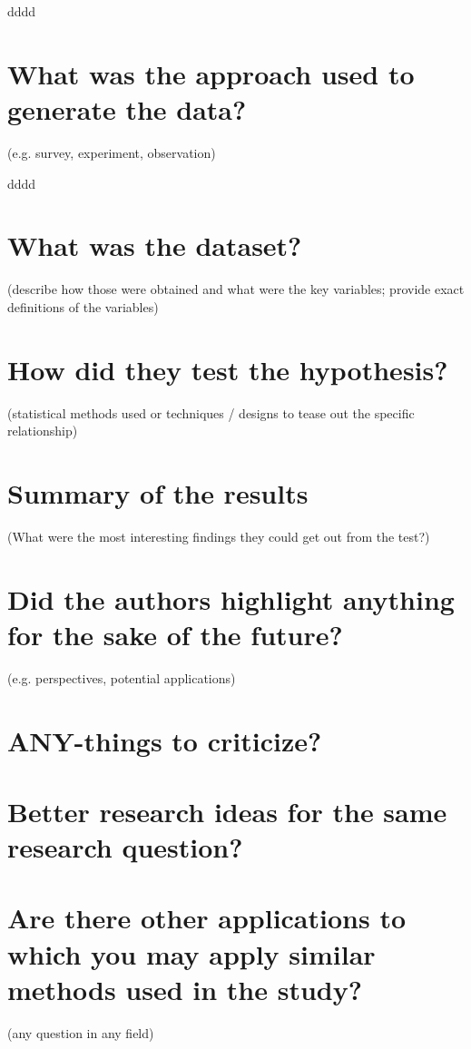\documentclass[conference]{IEEEtran}
\begin{document}
dddd

\section{What was the approach used to generate the data?}
\begin{center}
    (e.g. survey, experiment, observation)
\end{center}

dddd

\section{What was the dataset?}
\begin{center}
    (describe how those were obtained and what were the key variables; provide exact definitions of the variables)
\end{center}

\section{How did they test the hypothesis?}
\begin{center}
    (statistical methods used or techniques / designs to tease out the specific relationship)
\end{center}

\section{Summary of the results}
\begin{center}
    (What were the most interesting findings they could get out from the test?)
\end{center}

\section{Did the authors highlight anything for the sake of the future?}
\begin{center}
    (e.g. perspectives, potential applications)
\end{center}

\section{ANY-things to criticize?}

\section{Better research ideas for the same research question?}

\section{Are there other applications to which you may apply similar methods used in the study?}
\begin{center}
    (any question in any field)
\end{center}



\end{document}

